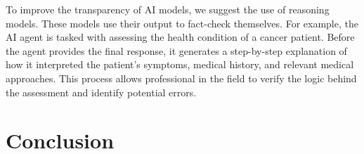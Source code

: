 To improve the transparency of AI models, we suggest the use of reasoning models. These models use their output to fact-check themselves. For example, the AI agent is tasked with assessing the health condition of a cancer patient. Before the agent provides the final response, it generates a step-by-step explanation of how it interpreted the patient’s symptoms, medical history, and relevant medical approaches. This process allows professional in the field to verify the logic behind the assessment and identify potential errors.


\section{Conclusion}



